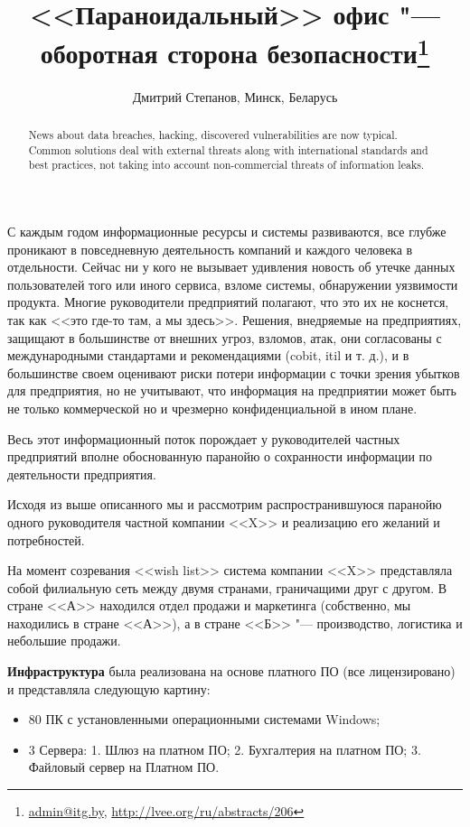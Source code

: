 \documentclass[10pt, a5paper]{article}
\begin{document}
\title{<<Параноидальный>> офис "---  оборотная сторона безопасности\footnote{\url{admin@itg.by}, \url{http://lvee.org/ru/abstracts/206}}}
\author{Дмитрий Степанов, Минск, Беларусь}
\maketitle
\begin{abstract}
News about data breaches, hacking, discovered vulnerabilities are now typical. Common solutions deal with external threats along with international standards and best practices, not taking into account non-commercial threats of information leaks.
\end{abstract}
С каждым годом информационные ресурсы и системы развиваются, все глубже проникают в повседневную деятельность компаний и каждого человека в отдельности. Сейчас ни у кого не вызывает удивления новость об утечке данных пользователей того или иного сервиса, взломе системы, обнаружении уязвимости продукта. Многие руководители предприятий полагают, что это их не коснется, так как <<это где-то там, а мы здесь>>. Решения, внедряемые на предприятиях, защищают в большинстве от внешних угроз, взломов, атак, они согласованы с международными стандартами и рекомендациями (cobit, itil и т. д.), и в большинстве своем оценивают риски потери информации с точки зрения  убытков для предприятия, но не учитывают, что информация на предприятии может быть не только коммерческой но и чрезмерно конфиденциальной в ином плане.

Весь этот информационный поток порождает у руководителей частных предприятий вполне обоснованную паранойю о сохранности информации по деятельности предприятия.

Исходя из выше описанного мы и рассмотрим распространившуюся паранойю одного руководителя частной компании <<X>>  и реализацию его желаний и потребностей.

На момент созревания <<wish list>> система компании <<X>> представляла собой филиальную сеть между двумя странами, граничащими друг с другом. В стране <<А>> находился отдел продажи и маркетинга (собственно, мы находились в стране <<А>>), а в стране <<Б>> "--- производство, логистика и небольшие продажи.

\textbf{Инфраструктура} была реализована на основе платного ПО (все лицензировано) и представляла следующую картину:

\begin{itemize}
  \item 80 ПК с установленными операционными системами Windows;
  \item 3 Сервера: 1. Шлюз на платном ПО; 2. Бухгалтерия на платном ПО; 3. Файловый сервер на Платном ПО.
\end{itemize}
\end{document}
